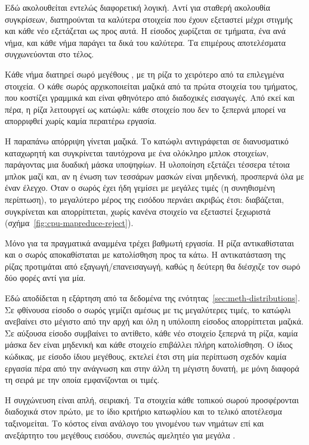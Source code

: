 Εδώ ακολουθείται εντελώς διαφορετική λογική. Αντί για σταθερή ακολουθία
συγκρίσεων, διατηρούνται τα  καλύτερα στοιχεία που έχουν εξεταστεί μέχρι
στιγμής και κάθε νέο εξετάζεται ως προς αυτά. Η είσοδος χωρίζεται σε τμήματα,
ένα ανά νήμα, και κάθε νήμα παράγει τα δικά του  καλύτερα. Τα επιμέρους
αποτελέσματα συγχωνεύονται στο τέλος.

Κάθε νήμα διατηρεί σωρό μεγέθους , με τη ρίζα το χειρότερο από τα
επιλεγμένα στοιχεία. Ο κάθε σωρός αρχικοποιείται μαζικά από τα πρώτα 
στοιχεία του τμήματος, που κοστίζει γραμμικά και είναι φθηνότερο από 
διαδοχικές εισαγωγές. Από εκεί και πέρα, η ρίζα λειτουργεί ως κατώφλι: κάθε
στοιχείο που δεν το ξεπερνά μπορεί να απορριφθεί χωρίς καμία περαιτέρω εργασία.

Η παραπάνω απόρριψη γίνεται μαζικά. Το κατώφλι αντιγράφεται σε διανυσματικό
καταχωρητή και συγκρίνεται ταυτόχρονα με ένα ολόκληρο μπλοκ στοιχείων,
παράγοντας μια δυαδική μάσκα υποψηφίων. Η υλοποίηση εξετάζει τέσσερα τέτοια
μπλοκ μαζί και, αν η ένωση των τεσσάρων μασκών είναι μηδενική, προσπερνά όλα με
έναν έλεγχο. Όταν ο σωρός έχει ήδη γεμίσει με μεγάλες τιμές (η συνηθισμένη
περίπτωση), το μεγαλύτερο μέρος της εισόδου περνάει ακριβώς έτσι: διαβάζεται,
συγκρίνεται και απορρίπτεται, χωρίς κανένα στοιχείο να εξεταστεί ξεχωριστά
(σχήμα~\ref{fig:cpu-mapreduce-reject}).



Μόνο για τα πραγματικά αναμμένα  τρέχει βαθμωτή εργασία. Η ρίζα
αντικαθίσταται και ο σωρός αποκαθίσταται με κατολίσθηση προς τα κάτω. Η
αντικατάσταση της ρίζας προτιμάται από εξαγωγή/επανεισαγωγή, καθώς η δεύτερη θα
διέσχιζε τον σωρό δύο φορές αντί για μία.

Εδώ αποδίδεται η εξάρτηση από τα δεδομένα της
ενότητας~\ref{sec:meth-distributions}. Σε φθίνουσα είσοδο ο σωρός γεμίζει
αμέσως με τις μεγαλύτερες τιμές, το κατώφλι ανεβαίνει στο μέγιστο από την αρχή
και όλη η υπόλοιπη είσοδος απορρίπτεται μαζικά. Σε αύξουσα είσοδο συμβαίνει το
αντίθετο, κάθε νέο στοιχείο ξεπερνά τη ρίζα, καμία μάσκα δεν είναι μηδενική και
κάθε στοιχείο επιβάλλει πλήρη κατολίσθηση. Ο ίδιος κώδικας, με είσοδο ίδιου
μεγέθους, εκτελεί έτσι στη μία περίπτωση σχεδόν καμία εργασία πέρα από την
ανάγνωση και στην άλλη τη μέγιστη δυνατή, με μόνη διαφορά τη σειρά με την οποία
εμφανίζονται οι τιμές.

Η συγχώνευση είναι απλή, σειριακή. Τα στοιχεία κάθε τοπικού σωρού προσφέρονται
διαδοχικά στον πρώτο, με το ίδιο κριτήριο κατωφλίου και το τελικό αποτέλεσμα
ταξινομείται. Το κόστος είναι ανάλογο του γινομένου των νημάτων επί  και
ανεξάρτητο του μεγέθους εισόδου, συνεπώς αμελητέο για μεγάλα .

